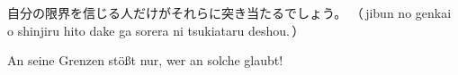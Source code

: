 {\raggedleft
\begin{minipage}[b]{\widthof{{\smaller\textcolor{black!60}{（\,jibun no genkai o shinjiru hito dake ga sorera ni tsukiataru deshou.\,）}}}}%
自分の限界を信じる人だけがそれらに突き当たるでしょう。\nl%
{\smaller\textcolor{black!60}{（\,jibun no genkai o shinjiru hito dake ga sorera ni tsukiataru deshou.\,）}}%
\end{minipage}\hspace*{3em}\nl%
An seine Grenzen stößt nur, wer an solche glaubt!\\
}
